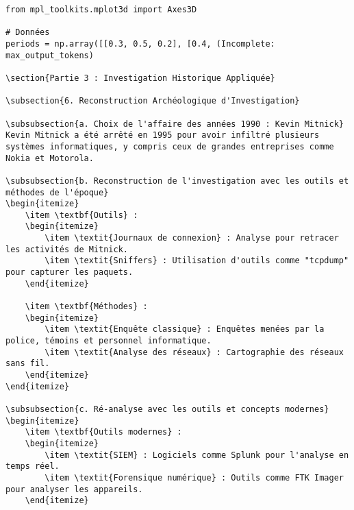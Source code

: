 \documentclass{article}
\begin{document}
\begin{verbatim}
from mpl_toolkits.mplot3d import Axes3D

# Données
periods = np.array([[0.3, 0.5, 0.2], [0.4, (Incomplete: max_output_tokens)

\section{Partie 3 : Investigation Historique Appliquée}

\subsection{6. Reconstruction Archéologique d'Investigation}

\subsubsection{a. Choix de l'affaire des années 1990 : Kevin Mitnick}
Kevin Mitnick a été arrêté en 1995 pour avoir infiltré plusieurs systèmes informatiques, y compris ceux de grandes entreprises comme Nokia et Motorola.

\subsubsection{b. Reconstruction de l'investigation avec les outils et méthodes de l'époque}
\begin{itemize}
    \item \textbf{Outils} :
    \begin{itemize}
        \item \textit{Journaux de connexion} : Analyse pour retracer les activités de Mitnick.
        \item \textit{Sniffers} : Utilisation d'outils comme "tcpdump" pour capturer les paquets.
    \end{itemize}

    \item \textbf{Méthodes} :
    \begin{itemize}
        \item \textit{Enquête classique} : Enquêtes menées par la police, témoins et personnel informatique.
        \item \textit{Analyse des réseaux} : Cartographie des réseaux sans fil.
    \end{itemize}
\end{itemize}

\subsubsection{c. Ré-analyse avec les outils et concepts modernes}
\begin{itemize}
    \item \textbf{Outils modernes} :
    \begin{itemize}
        \item \textit{SIEM} : Logiciels comme Splunk pour l'analyse en temps réel.
        \item \textit{Forensique numérique} : Outils comme FTK Imager pour analyser les appareils.
    \end{itemize}


\end{verbatim}
\end{document}
